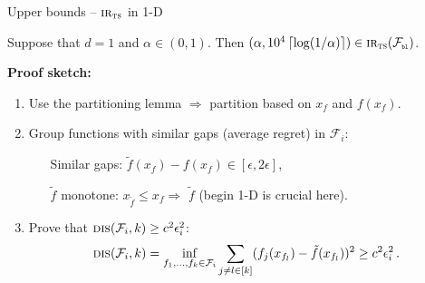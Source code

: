 \documentclass{beamer}
\newcommand{\dis}{\operatorname{\textsc{dis}}}
\newcommand{\cF}{\mathcal{F}}
\newcommand{\ts}{{\textsc{ts}}}
\newcommand{\pb}{\text{\tiny\texttt{b}}}
\newcommand{\pl}{\text{\tiny\texttt{l}}}
\newcommand{\IR}{\operatorname{\textsc{ir}}}
\newcommand{\ceil}[1]{\left\lceil #1 \right\rceil}
\begin{document}

\begin{frame}{Upper bounds -- $\IR_\ts$ in 1-D}
    \small
    \begin{tcolorbox}[title=Theorem 3 -- $\IR_\ts$ in 1-D,colback=blue!5!white,colframe=blue!50!black]
        Suppose that $d = 1$ and $\alpha \in (0,1)$. Then $(\alpha, 10^4 \ceil{\log(1/\alpha)}) \in \IR_\ts(\cF_{\pb\pl})$.
    \end{tcolorbox}
    \textbf{Proof sketch:}
    \begin{enumerate}
        \item Use the partitioning lemma $\Rightarrow$ partition  based on $x_f$ and $f(x_f)$.
        \item Group functions with similar gaps (average regret) in $\cF_i$:
              \begin{enumerate}
                  \leftskip=4em %
                  \item[Similar gaps:] $\tilde{f}(x_f) - f(x_f) \in [\epsilon, 2\epsilon]$,
                  \item[$\tilde{f}$ monotone:] $x_{\tilde{f}} \leq x_f \Rightarrow $ $\tilde{f}$ (begin 1-D is crucial here).
              \end{enumerate}
        \item Prove that $\dis(\cF_i, k) \geq c^2\epsilon_i^2$:
              \[
                  \dis(\cF_i, k) = \inf_{f_1,\ldots,f_k \in \cF_i} \sum_{j\neq l \in [k]} (f_j(x_{f_l}) - \tilde f(x_{f_l}))^2 \geq c^2\epsilon_i^2\,.
              \]
    \end{enumerate}
\end{frame}
\end{document}
